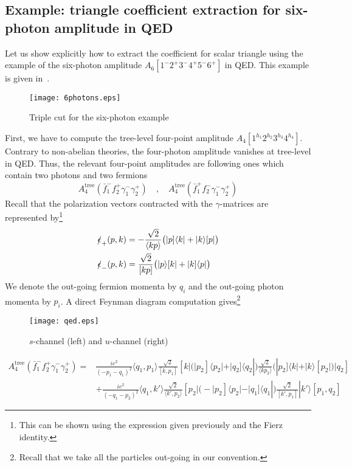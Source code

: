 \subsection{Example: triangle coefficient extraction for six-photon amplitude in QED}
Let us show explicitly how to extract the coefficient for scalar triangle using the example of the six-photon amplitude $A_6[1^-2^+3^-4^+5^-6^+]$ in QED.
This example is given in~\cite{Forde:2007mi}.
\begin{figure}
  \centering
  \texttt{[image: 6photons.eps]}
  \caption{Triple cut for the six-photon example}
  \label{fig-6photons}
\end{figure}
First, we have to compute the tree-level four-point amplitude $A_4[1^{h_1}2^{h_2}3^{h_3}4^{h_4}]$. 
Contrary to non-abelian theories, the four-photon amplitude vanishes at tree-level in QED.
Thus, the relevant four-point amplitudes are following ones which contain two photons and two fermions
\begin{equation}
A_4^{\mathrm{tree}}(\bar{f}_1^- f_2^+ \gamma_1^-\gamma_2^+)
\quad,\quad
A_4^{\mathrm{tree}}(\bar{f}_1^+ f_2^- \gamma_1^-\gamma_2^+)
\end{equation}
Recall that the polarization vectors contracted with the $\gamma$-matrices are represented by\footnote{This can be shown using the expression given previously and the Fierz identity.}
\begin{equation}
\begin{split}
& \slashed{\epsilon}_+(p,k) = -\frac{\sqrt{2}}{\langle kp\rangle}\big(|p]\langle k| + |k\rangle[p|\big)
\\
& \slashed{\epsilon}_-(p,k) = \frac{\sqrt{2}}{[kp]}\big(|p\rangle [k| + |k]\langle p|\big)
\end{split}
\end{equation}
We denote the out-going fermion momenta by $q_i$ and the out-going photon momenta by $p_i$. 
A direct Feynman diagram computation gives\footnote{Recall that we take all the particles out-going in our convention.}
\begin{figure}[h]
  \centering
  \texttt{[image: qed.eps]}
  \caption{$s$-channel (left) and $u$-channel (right)}
  \label{fig-qed}
\end{figure}
%
\begin{equation}
\begin{split}
A_{4}^{\mathrm{tree}}(\bar{f}_1^- f_2^+ \gamma_1^-\gamma_2^+) 
= &
\frac{ie^2}{(-p_1 - q_1)^2}\langle q_1, p_1\rangle \frac{\sqrt{2}}{[k, p_1]}
[k|\big(|p_2] \langle p_2| + |q_2]\langle q_2|\big)
\frac{\sqrt{2}}{\langle k p_2\rangle}
\big(|p_2]\langle k| + |k\rangle[p_2|\big) |q_2]
\\
&
+\frac{ie^2}{(-q_1-p_2)^2}\langle q_1, k'\rangle
\frac{\sqrt{2}}{\langle k', p_2\rangle}[p_2|
\big( -|p_2]\langle p_2| - |q_1]\langle q_1|\big)
\frac{\sqrt{2}}{[k', p_1]}|k'\rangle [p_1, q_2]
\end{split}
\end{equation}
